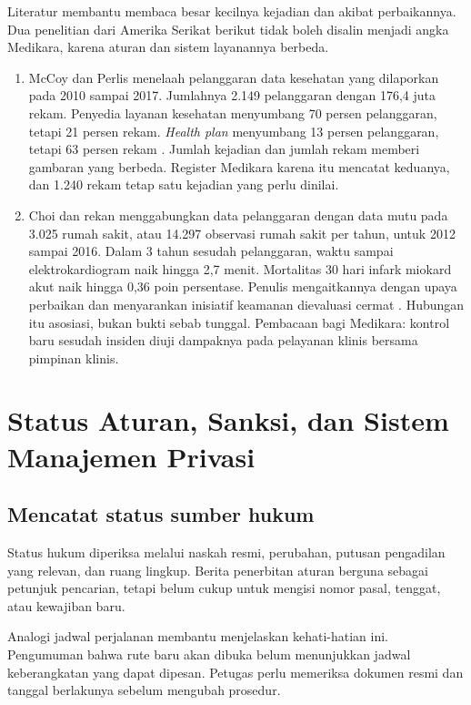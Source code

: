 Literatur membantu membaca besar kecilnya kejadian dan akibat perbaikannya. Dua penelitian dari
Amerika Serikat berikut tidak boleh disalin menjadi angka Medikara, karena aturan dan sistem
layanannya berbeda.
\begin{enumerate}
  \item McCoy dan Perlis menelaah pelanggaran data kesehatan yang dilaporkan pada 2010 sampai 2017.
  Jumlahnya 2.149 pelanggaran dengan 176,4 juta rekam. Penyedia layanan kesehatan menyumbang 70
  persen pelanggaran, tetapi 21 persen rekam. \textit{Health plan} menyumbang 13 persen pelanggaran,
  tetapi 63 persen rekam \cite{c07-mccoy2018}. Jumlah kejadian dan jumlah rekam memberi gambaran
  yang berbeda. Register Medikara karena itu mencatat keduanya, dan 1.240 rekam tetap satu kejadian
  yang perlu dinilai.
  \item Choi dan rekan menggabungkan data pelanggaran dengan data mutu pada 3.025 rumah sakit, atau
  14.297 observasi rumah sakit per tahun, untuk 2012 sampai 2016. Dalam 3 tahun sesudah pelanggaran,
  waktu sampai elektrokardiogram naik hingga 2,7 menit. Mortalitas 30 hari infark miokard akut naik
  hingga 0,36 poin persentase. Penulis mengaitkannya dengan upaya perbaikan dan menyarankan
  inisiatif keamanan dievaluasi cermat \cite{c07-choi2019}. Hubungan itu asosiasi, bukan bukti sebab
  tunggal. Pembacaan bagi Medikara: kontrol baru sesudah insiden diuji dampaknya pada pelayanan
  klinis bersama pimpinan klinis.
\end{enumerate}

\section{Status Aturan, Sanksi, dan Sistem Manajemen Privasi}

\subsection*{Mencatat status sumber hukum}

Status hukum diperiksa melalui naskah resmi, perubahan, putusan pengadilan yang relevan, dan ruang
lingkup. Berita penerbitan aturan berguna sebagai petunjuk pencarian, tetapi belum cukup untuk
mengisi nomor pasal, tenggat, atau kewajiban baru.

Analogi jadwal perjalanan membantu menjelaskan kehati-hatian ini. Pengumuman bahwa rute baru akan
dibuka belum menunjukkan jadwal keberangkatan yang dapat dipesan. Petugas perlu memeriksa dokumen
resmi dan tanggal berlakunya sebelum mengubah prosedur.

